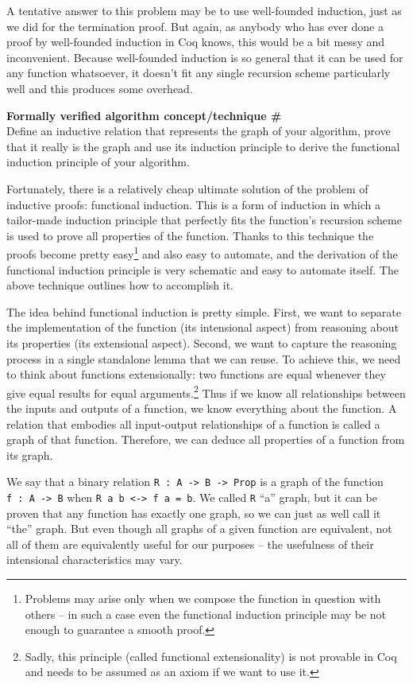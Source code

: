 \documentclass[declaration,mgr,english,shortabstract]{iithesis}
\newcommand{\m}[1]{\texttt{#1}}
\newcounter{cnt}
\newcommand{\runcnt}{\#\arabic{cnt}}
\newcommand{\concept}[1]
{
    \refstepcounter{cnt}
    \begin{center}
        \textbf{Formally verified algorithm concept/technique \runcnt} \\
        #1
    \end{center}
}
\begin{document}
A tentative answer to this problem may be to use well-founded induction, just as we did for the termination proof. But again, as anybody who has ever done a proof by well-founded induction in Coq knows, this would be a bit messy and inconvenient. Because well-founded induction is so general that it can be used for any function whatsoever, it doesn't fit any single recursion scheme particularly well and this produces some overhead.

\concept{Define an inductive relation that represents the graph of your algorithm, prove that it really is the graph and use its induction principle to derive the functional induction principle of your algorithm.}

Fortunately, there is a relatively cheap ultimate solution of the problem of inductive proofs: functional induction. This is a form of induction in which a tailor-made induction principle that perfectly fits the function's recursion scheme is used to prove all properties of the function. Thanks to this technique the proofs become pretty easy\footnote{Problems may arise only when we compose the function in question with others -- in such a case even the functional induction principle may be not enough to guarantee a smooth proof.} and also easy to automate, and the derivation of the functional induction principle is very schematic and easy to automate itself. The above technique outlines how to accomplish it.

The idea behind functional induction is pretty simple. First, we want to separate the implementation of the function (its intensional aspect) from reasoning about its properties (its extensional aspect). Second, we want to capture the reasoning process in a single standalone lemma that we can reuse. To achieve this, we need to think about functions extensionally: two functions are equal whenever they give equal results for equal arguments.\footnote{Sadly, this principle (called functional extensionality) is not provable in Coq and needs to be assumed as an axiom if we want to use it.} Thus if we know all relationships between the inputs and outputs of a function, we know everything about the function. A relation that embodies all input-output relationships of a function is called a graph of that function. Therefore, we can deduce all properties of a function from its graph.

We say that a binary relation \m{R\ :\ A -> B -> Prop} is a graph of the function \m{f\ :\ A -> B} when \m{R a b <-> f a = b}. We called \m{R} ``a'' graph, but it can be proven that any function has exactly one graph, so we can just as well call it ``the'' graph. But even though all graphs of a given function are equivalent, not all of them are equivalently useful for our purposes -- the usefulness of their intensional characteristics may vary.
\end{document}
